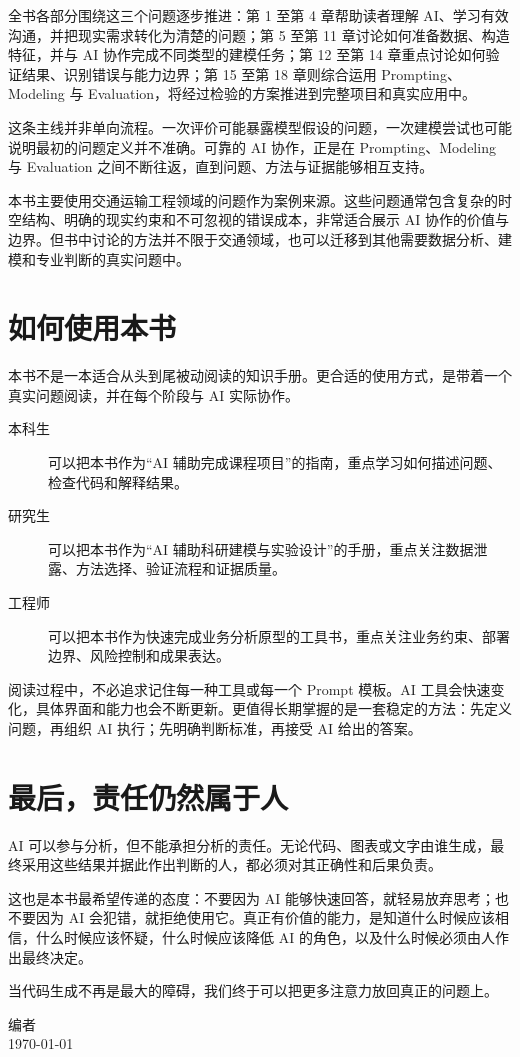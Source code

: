 全书各部分围绕这三个问题逐步推进：第 1 至第 4 章帮助读者理解 AI、学习有效沟通，并把现实需求转化为清楚的问题；第 5 至第 11 章讨论如何准备数据、构造特征，并与 AI 协作完成不同类型的建模任务；第 12 至第 14 章重点讨论如何验证结果、识别错误与能力边界；第 15 至第 18 章则综合运用 Prompting、Modeling 与 Evaluation，将经过检验的方案推进到完整项目和真实应用中。

这条主线并非单向流程。一次评价可能暴露模型假设的问题，一次建模尝试也可能说明最初的问题定义并不准确。可靠的 AI 协作，正是在 Prompting、Modeling 与 Evaluation 之间不断往返，直到问题、方法与证据能够相互支持。

本书主要使用交通运输工程领域的问题作为案例来源。这些问题通常包含复杂的时空结构、明确的现实约束和不可忽视的错误成本，非常适合展示 AI 协作的价值与边界。但书中讨论的方法并不限于交通领域，也可以迁移到其他需要数据分析、建模和专业判断的真实问题中。

\section*{如何使用本书}

本书不是一本适合从头到尾被动阅读的知识手册。更合适的使用方式，是带着一个真实问题阅读，并在每个阶段与 AI 实际协作。

\begin{description}
  \item[本科生] 可以把本书作为“AI 辅助完成课程项目”的指南，重点学习如何描述问题、检查代码和解释结果。
  \item[研究生] 可以把本书作为“AI 辅助科研建模与实验设计”的手册，重点关注数据泄露、方法选择、验证流程和证据质量。
  \item[工程师] 可以把本书作为快速完成业务分析原型的工具书，重点关注业务约束、部署边界、风险控制和成果表达。
\end{description}

阅读过程中，不必追求记住每一种工具或每一个 Prompt 模板。AI 工具会快速变化，具体界面和能力也会不断更新。更值得长期掌握的是一套稳定的方法：先定义问题，再组织 AI 执行；先明确判断标准，再接受 AI 给出的答案。

\section*{最后，责任仍然属于人}

AI 可以参与分析，但不能承担分析的责任。无论代码、图表或文字由谁生成，最终采用这些结果并据此作出判断的人，都必须对其正确性和后果负责。

这也是本书最希望传递的态度：不要因为 AI 能够快速回答，就轻易放弃思考；也不要因为 AI 会犯错，就拒绝使用它。真正有价值的能力，是知道什么时候应该相信，什么时候应该怀疑，什么时候应该降低 AI 的角色，以及什么时候必须由人作出最终决定。

当代码生成不再是最大的障碍，我们终于可以把更多注意力放回真正的问题上。

\vspace{2em}
\begin{flushright}
编者\\
\today
\end{flushright}

